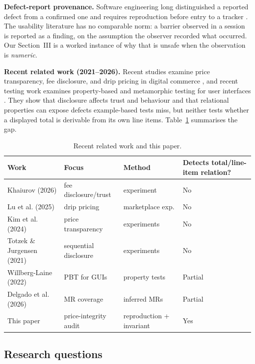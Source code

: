 \documentclass[conference]{IEEEtran}
\begin{document}
\textbf{Defect-report provenance.} Software engineering long distinguished a reported defect from a
confirmed one and requires reproduction before entry to a tracker \cite{sei2002}. The usability
literature has no comparable norm: a barrier observed in a session is reported as a finding, on the
assumption the observer recorded what occurred. Our Section~III is a worked instance of why that is
unsafe when the observation is \emph{numeric}.

\textbf{Recent related work (2021--2026).} Recent studies examine price transparency, fee
disclosure, and drip pricing in digital commerce \cite{khaiurov2026,lu2025,kim2024,totzek2021}, and
recent testing work examines property-based and metamorphic testing for user interfaces
\cite{willberg2022,delgado2026}. They show that disclosure affects trust and behaviour and that
relational properties can expose defects example-based tests miss, but neither tests whether a
displayed total is derivable from its own line items. Table~\ref{tab:recent} summarises the gap.

\begin{table}[h]
\caption{Recent related work and this paper.}
\label{tab:recent}
\centering
\footnotesize
\begin{tabular}{@{}>{\raggedright\arraybackslash}p{}>{\raggedright\arraybackslash}p{}>{\raggedright\arraybackslash}p{}>{\raggedright\arraybackslash}p{}@{}}
\toprule
Work & Focus & Method & Detects total/line-item relation? \\
\midrule
Khaiurov (2026) & fee disclosure/trust & experiment & No \\
Lu et al. (2025) & drip pricing & marketplace exp. & No \\
Kim et al. (2024) & price transparency & experiments & No \\
Totzek \& Jurgensen (2021) & sequential disclosure & experiments & No \\
Willberg-Laine (2022) & PBT for GUIs & property tests & Partial \\
Delgado et al. (2026) & MR coverage & inferred MRs & Partial \\
This paper & price-integrity audit & reproduction + invariant & Yes \\
\bottomrule
\end{tabular}
\end{table}

\subsection{Research questions}
\end{document}

